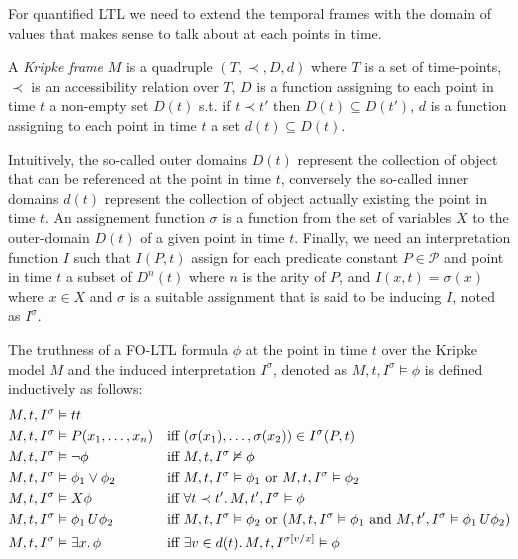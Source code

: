 For quantified LTL we need to extend the temporal frames with the domain of values that makes sense to talk about at
each points in time.

\begin{definition}
  A \emph{Kripke frame} $M$ is a quadruple $(T, \prec, D, d)$ where $T$ is a set of time-points, $\prec$ is an
  accessibility relation over $T$, $D$ is a function assigning to each point in time $t$ a non-empty set $D(t)$ s.t.
  if $t \prec t'$ then $D(t) \subseteq D(t')$, $d$ is a function assigning to each point in time $t$ a set $d(t)
  \subseteq D(t)$.
\end{definition}
Intuitively, the so-called outer domains $D(t)$ represent the collection of object that can be referenced at the point
in time $t$, conversely the so-called inner domains $d(t)$ represent the collection of object actually existing the
point in time $t$. An assignement function $\sigma$ is a function from the set of variables $X$ to the outer-domain
$D(t)$ of a given point in time $t$. Finally, we need an interpretation function $I$ such that $I(P, t)$ assign for each
predicate constant $P \in \mathcal{P}$ and point in time $t$ a subset of $D^n(t)$ where $n$ is the arity of $P$, and
$I(x, t) = \sigma(x)$ where $x \in X$ and $\sigma$ is a suitable assignment that is said to be inducing $I$, noted as
$I^\sigma$.

\begin{definition}
  The truthness of a FO-LTL formula $\phi$ at the point in time $t$ over the Kripke model $M$ and the induced
  interpretation $I^\sigma$, denoted as $M, t, I^\sigma \vDash \phi$ is defined inductively as follows:
  \begin{align*}
    M, t, I^\sigma &\vDash tt && \\
    M, t, I^\sigma &\vDash P(x_1, \ldots, x_n) &&\text{iff } (\sigma(x_1), \ldots, \sigma(x_2)) \in I^\sigma(P, t) \\
    M, t, I^\sigma &\vDash \neg\phi &&\text{iff } M, t, I^\sigma \nvDash \phi \\
    M, t, I^\sigma &\vDash \phi_1 \lor \phi_2 &&\text{iff } M, t, I^\sigma \vDash \phi_1 \text{ or } M, t, I^\sigma
      \vDash \phi_2 \\
    M, t, I^\sigma &\vDash X{\phi} &&\text{iff } \forall {t \prec t'} \ldotp {M, t', I^\sigma \vDash \phi} \\
    M, t, I^\sigma &\vDash {\phi_1}\,U {\phi_2} &&\text{iff } M, t, I^\sigma \vDash \phi_2 \text{ or }
      (M, t, I^\sigma \vDash \phi_1 \text{ and } M, t', I^\sigma \vDash {\phi_1}\,U {\phi_2}) \\
    M, t, I^\sigma &\vDash \exists {x} \ldotp {\phi} &&\text{iff } \exists {v \in d(t)} \ldotp {M, t, I^{\sigma[v/x]} \vDash \phi} \\
  \end{align*}
\end{definition}

